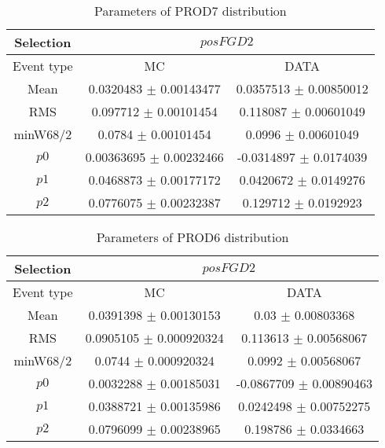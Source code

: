 \documentclass[a4paper,12pt]{article}
\begin{document}
\begin{table}[htbp]
\begin{center}
\begin{tabular}{|c|c|c|}
        \hline
        Selection & \multicolumn{2}{|c|}{$posFGD2$}  \\ \hline
        Event type & MC & DATA \\ 
        \hline
        Mean & 0.0320483 $\pm$ 0.00143477 & 0.0357513 $\pm$ 0.00850012 \\ 
        \hline 
        RMS & 0.097712 $\pm$ 0.00101454 & 0.118087 $\pm$ 0.00601049 \\ 
        \hline 
        minW68/2 & 0.0784 $\pm$ 0.00101454 & 0.0996 $\pm$ 0.00601049 \\ 
        \hline 
        $p0$ & 0.00363695 $\pm$ 0.00232466 & -0.0314897 $\pm$ 0.0174039 \\ 
        \hline 
        $p1$ & 0.0468873 $\pm$ 0.00177172 & 0.0420672 $\pm$ 0.0149276 \\ 
        \hline 
        $p2$ & 0.0776075 $\pm$ 0.00232387 & 0.129712 $\pm$ 0.0192923 \\ 
        \hline 
\end{tabular}
\caption{Parameters of PROD7 distribution } \vspace{0.2in}
\label{xxx}
\end{center}
\end{table}
\begin{table}[htbp]
\begin{center}
\begin{tabular}{|c|c|c|}
        \hline
        Selection & \multicolumn{2}{|c|}{$posFGD2$}  \\ \hline
        Event type & MC & DATA \\ 
        \hline
        Mean & 0.0391398 $\pm$ 0.00130153 & 0.03 $\pm$ 0.00803368 \\ 
        \hline 
        RMS & 0.0905105 $\pm$ 0.000920324 & 0.113613 $\pm$ 0.00568067 \\ 
        \hline 
        minW68/2 & 0.0744 $\pm$ 0.000920324 & 0.0992 $\pm$ 0.00568067 \\ 
        \hline 
        $p0$ & 0.0032288 $\pm$ 0.00185031 & -0.0867709 $\pm$ 0.00890463 \\ 
        \hline 
        $p1$ & 0.0388721 $\pm$ 0.00135986 & 0.0242498 $\pm$ 0.00752275 \\ 
        \hline 
        $p2$ & 0.0796099 $\pm$ 0.00238965 & 0.198786 $\pm$ 0.0334663 \\ 
        \hline 
\end{tabular}
\caption{Parameters of PROD6 distribution } \vspace{0.2in}
\label{xxx}
\end{center}
\end{table}
\end{document}

